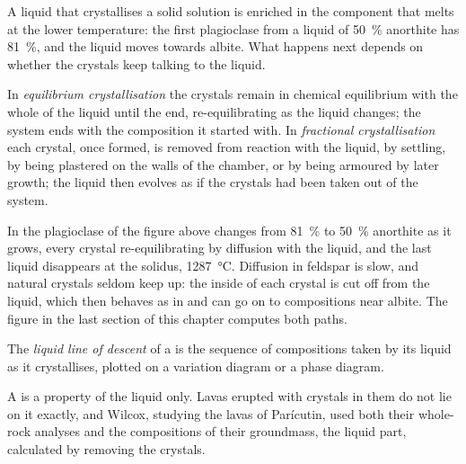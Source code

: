 A liquid that crystallises a solid solution is enriched in the component that
melts at the lower temperature: the first plagioclase from a liquid of
\qty{50}{\percent} anorthite has \qty{81}{\percent}, and the liquid moves towards
albite. What happens next depends on whether the crystals keep talking to the
liquid.

\begin{definition}
\label{def:b2:magmatic-differentiation:crystallisation}
In \emph{equilibrium crystallisation} the
crystals remain in chemical equilibrium with the whole of the liquid until the
end, re-equilibrating as the liquid changes; the system ends with the composition
it started with. In \emph{fractional crystallisation} each crystal, once formed, is removed from reaction with the
liquid, by settling, by being plastered on the walls of the chamber, or by being
armoured by later growth; the liquid then evolves as if the crystals had been
taken out of the system.
\end{definition}

In  the plagioclase of the figure above changes from
\qty{81}{\percent} to \qty{50}{\percent} anorthite as it grows, every crystal
re-equilibrating by diffusion with the liquid, and the last liquid disappears at
the solidus, \qty{1287}{\celsius}. Diffusion in feldspar is slow, and natural
crystals seldom keep up: the inside of each crystal is cut off from the liquid,
which then behaves as in  and can go on to compositions
near albite. The figure in the last section of this chapter computes both paths.

\begin{definition}\label{def:b2:magmatic-differentiation:lld}
The \emph{liquid line of descent} of a  is the
sequence of compositions taken by its liquid as it crystallises, plotted on a
variation diagram or a phase diagram.
\end{definition}

A  is a property of the liquid only. Lavas erupted with
crystals in them do not lie on it exactly, and Wilcox, studying the lavas of
Parícutin, used both their whole-rock analyses and the compositions of their
groundmass, the liquid part, calculated by removing the crystals.

